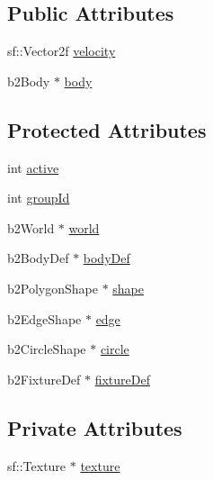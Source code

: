 \subsection*{Public Attributes}
\begin{DoxyCompactItemize}
\item 
sf\+::\+Vector2f \hyperlink{classSekander_1_1Entity_a7c88f6c5a89eca36cb1204c4eaf0868e}{velocity}
\item 
b2\+Body $\ast$ \hyperlink{classSekander_1_1Entity_a61bec1a7b77dd9b5e08c0908566450d4}{body}
\end{DoxyCompactItemize}
\subsection*{Protected Attributes}
\begin{DoxyCompactItemize}
\item 
int \hyperlink{classSekander_1_1Entity_a6bd181c05edd3e27fa18efdd5dab2895}{active}
\item 
int \hyperlink{classSekander_1_1Entity_a877b3b7b7b81c7e11cb174d1a4fc3b85}{group\+Id}
\item 
b2\+World $\ast$ \hyperlink{classSekander_1_1Entity_a6c88c4e735203734409fdd7b1eddca39}{world}
\item 
b2\+Body\+Def $\ast$ \hyperlink{classSekander_1_1Entity_af8218d721852341a99eb08ee8ead53ff}{body\+Def}
\item 
b2\+Polygon\+Shape $\ast$ \hyperlink{classSekander_1_1Entity_a51d32e27f0af3c9f1d68cc27117310ad}{shape}
\item 
b2\+Edge\+Shape $\ast$ \hyperlink{classSekander_1_1Entity_a85af7309806860be286eb7b7fa89856e}{edge}
\item 
b2\+Circle\+Shape $\ast$ \hyperlink{classSekander_1_1Entity_ab1117f25502fe84887cae07b40272bbf}{circle}
\item 
b2\+Fixture\+Def $\ast$ \hyperlink{classSekander_1_1Entity_a1320e01ecadb8733a7a6204c8383bd4c}{fixture\+Def}
\end{DoxyCompactItemize}
\subsection*{Private Attributes}
\begin{DoxyCompactItemize}
\item 
sf\+::\+Texture $\ast$ \hyperlink{classSekander_1_1Entity_afb04e74d48d113702c32c991accda0cc}{texture}
\end{DoxyCompactItemize}


